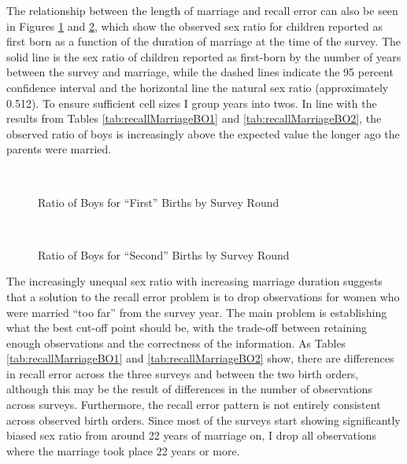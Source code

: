 \documentclass[12pt,letterpaper]{article}
\begin{document}





The relationship between the length of marriage and recall error can also be seen in 
Figures \ref{fig:sex_ratio_recall_rounds_bo1} and \ref{fig:sex_ratio_recall_rounds_bo2}, 
which show the observed sex ratio for children reported as first born as a function of 
the duration of marriage at the time of the survey.
The solid line is the sex ratio of children reported as first-born by the number of years 
between the survey and marriage, while the dashed lines indicate the 95 percent confidence 
interval and the horizontal line the natural sex ratio (approximately 0.512).
To ensure sufficient cell sizes I group years into twos.
In line with the results from Tables \ref{tab:recallMarriageBO1} and 
\ref{tab:recallMarriageBO2}, the observed ratio of boys is increasingly above the expected 
value the longer ago the parents were married.

\begin{figure}
\centering
{}
 \\
\caption{Ratio of Boys for ``First'' Births by Survey Round}
\label{fig:sex_ratio_recall_rounds_bo1}
\end{figure}

\begin{figure}
\centering
{}
 \\
\caption{Ratio of Boys for ``Second'' Births by Survey Round}
\label{fig:sex_ratio_recall_rounds_bo2}
\end{figure}


The increasingly unequal sex ratio with increasing marriage duration suggests that
a solution to the recall error problem is to drop observations for 
women who were married ``too far'' from the survey year.
The main problem is establishing what the best cut-off point should be, with the
trade-off between retaining enough observations and the correctness of the information.
As Tables \ref{tab:recallMarriageBO1} and \ref{tab:recallMarriageBO2} show, there are 
differences in recall error across the three surveys and between the two birth
orders, although this may be the result of differences in the number of observations 
across surveys.
Furthermore, the recall error pattern is not entirely consistent across observed birth 
orders.
Since most of the surveys start showing significantly biased sex ratio from around 22
years of marriage on, I drop all observations where the marriage took place 22 years
or more.
\end{document}
